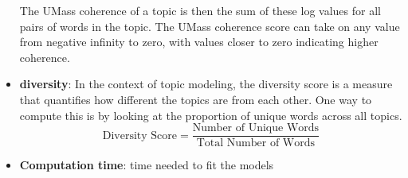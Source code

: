 \begin{itemize}
    The UMass coherence of a topic is then the sum of these log values for all pairs of words in the topic. The UMass coherence score can take on any value from negative infinity to zero, with values closer to zero indicating higher coherence.
    

    \item \textbf{diversity}: In the context of topic modeling, the diversity score is a measure that quantifies how different the topics are from each other. One way to compute this is by looking at the proportion of unique words across all topics.
    \begin{equation}
            \text{Diversity Score} = \frac{{\text{Number of Unique Words}}}{{\text{Total Number of Words}}}
    \end{equation}


    \item \textbf{Computation time}: time needed to fit the models
\end{itemize}